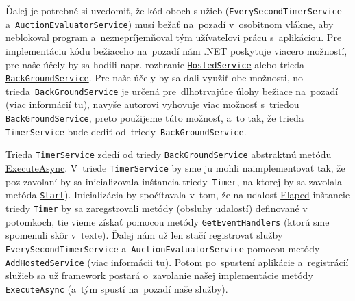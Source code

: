 Ďalej je potrebné si uvedomiť, že kód oboch služieb (\verb|EverySecondTimerService| a~\verb|AuctionEvaluatorService|) musí bežať na~pozadí v~osobitnom vlákne, aby neblokoval program a~neznepríjemňoval tým užívateľovi prácu s~aplikáciou. Pre implementáciu kódu bežiaceho na~pozadí nám .NET poskytuje viacero možností, pre naše účely by sa hodili napr. rozhranie \href{https://learn.microsoft.com/en-us/aspnet/core/fundamentals/host/hosted-services?view=aspnetcore-7.0&tabs=visual-studio\#ihostedservice-interface}{\texttt{HostedService}} alebo trieda \href{https://learn.microsoft.com/en-us/aspnet/core/fundamentals/host/hosted-services?view=aspnetcore-7.0&tabs=visual-studio\#backgroundservice-base-class}{\texttt{BackGroundService}}. Pre naše účely by sa dali využiť obe možnosti, no trieda~\verb|BackGroundService| je určená pre~dlhotrvajúce úlohy bežiace na~pozadí (viac informácií \href{https://www.compositional-it.com/news-blog/background-tasks-in-net}{tu}), navyše autorovi vyhovuje viac možnosť s~triedou \verb|BackGroundService|, preto použijeme túto možnosť, a~to tak, že trieda \verb|TimerService| bude dediť od~triedy~\verb|BackGroundService|.

Trieda \verb|TimerService| zdedí od triedy \verb|BackGroundService| abstraktnú metódu \href{https://learn.microsoft.com/en-us/dotnet/api/microsoft.extensions.hosting.backgroundservice.executeasync?view=dotnet-plat-ext-7.0\#microsoft-extensions-hosting-backgroundservice-executeasync(system-threading-cancellationtoken)}{ExecuteAsync}. V~triede \verb|TimerService| by sme ju mohli naimplementovať tak, že poz zavolaní by sa inicializovala inštancia triedy~\verb|Timer|, na ktorej by sa zavolala metóda \href{https://learn.microsoft.com/en-us/dotnet/api/system.timers.timer.start}{\texttt{Start}}). Inicializácia by spočítavala v~tom, že na udalosť \href{https://learn.microsoft.com/en-us/dotnet/api/system.timers.timer.elapsed}{Elaped} inštancie triedy \verb|Timer| by sa zaregstrovali metódy (obsluhy udalostí) definované v potomkoch, tie vieme získať pomocou metódy \verb|GetEventHandlers| (ktorú sme spomenuli skôr v~texte). Ďalej nám už len stačí registrovať služby \verb|EverySecondTimerService| a~\verb|AuctionEvaluatorService| pomocou metódy \verb|AddHostedService| (viac informácii \href{https://learn.microsoft.com/en-us/dotnet/core/extensions/timer-service?pivots=dotnet-7-0}{tu}). Potom po~spustení aplikácie a~registrácií služieb sa už framework postará o~zavolanie našej implementácie metódy \verb|ExecuteAsync| (a~tým spustí na~pozadí naše služby).

